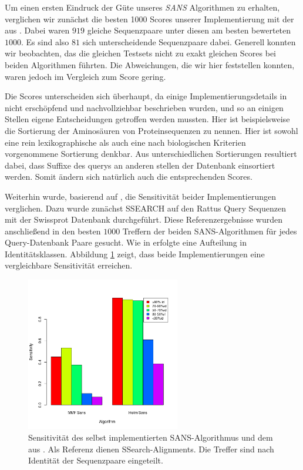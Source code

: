 \documentclass{article}
\begin{document}
Um einen ersten Eindruck der Güte unseres \emph{SANS} Algorithmen zu erhalten, verglichen wir zunächst die besten 1000 Scores unserer Implementierung
mit der aus \cite{Holm}. Dabei waren $919$ gleiche Sequenzpaare unter diesen am besten bewerteten $1000$. Es sind also $81$ sich unterscheidende
Sequenzpaare dabei. Generell konnten wir beobachten, das die gleichen Testsets nicht zu exakt gleichen Scores bei beiden Algorithmen führten. Die
Abweichungen, die wir hier feststellen konnten, waren jedoch im Vergleich zum Score gering.

Die Scores unterscheiden sich überhaupt, da einige Implementierungsdetails in \cite{Holm} nicht erschöpfend und nachvollziehbar beschrieben wurden,
und so an einigen Stellen eigene Entscheidungen getroffen werden mussten. Hier ist beispielsweise die Sortierung der Aminosäuren von Proteinsequenzen
zu nennen. Hier ist sowohl eine rein lexikographische als auch eine nach biologischen Kriterien vorgenommene Sortierung denkbar. Aus unterschiedlichen
Sortierungen resultiert dabei, dass Suffixe des querys an anderen stellen der Datenbank einsortiert werden. Somit ändern sich natürlich auch die 
entsprechenden Scores.

Weiterhin wurde, basierend auf \cite{Holm}, die Sensitivität beider Implementierungen verglichen. Dazu wurde zunächst SSEARCH auf den Rattus Query
Sequenzen mit der Swissprot Datenbank durchgeführt. Diese Referenzergebnisse wurden anschließend in den besten $1000$ Treffern der beiden SANS-Algorithmen
für jedes Query-Datenbank Paare gesucht. Wie in \cite{Holm} erfolgte eine Aufteilung in Identitätsklassen. Abbildung \ref{barplot} zeigt, dass beide
Implementierungen eine vergleichbare Sensitivität erreichen.

\begin{figure}
  \begin{center}
    \includegraphics[width=0.6\textwidth]{img/barplot_beide.png}
    \caption{Sensitivität des selbst implementierten SANS-Algorithmus und dem aus \cite{Holm}. Als Referenz dienen SSearch-Alignments.
    Die Treffer sind nach Identität der Sequenzpaare eingeteilt.}
    \label{barplot}
  \end{center}
\end{figure}
\end{document}
